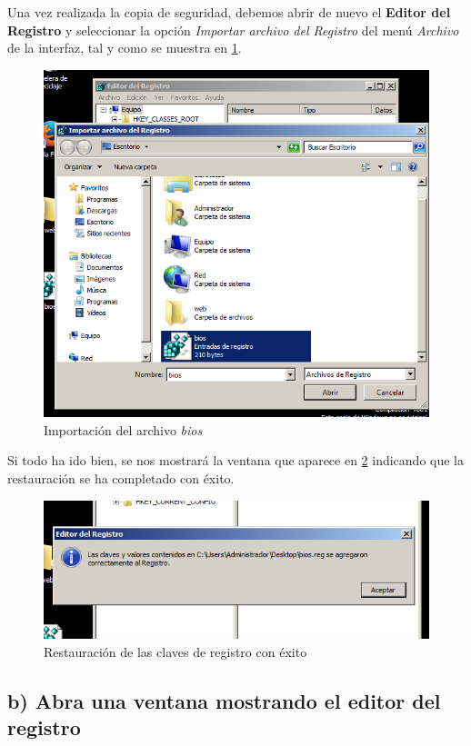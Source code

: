 Una vez realizada la copia de seguridad, debemos abrir de nuevo el \textbf{Editor del Registro} y seleccionar la opción \textit{Importar archivo del Registro} del menú \textit{Archivo} de la interfaz, tal y como se muestra en \ref{07}.

\begin{figure}[H]
	\centering
	\includegraphics[scale=0.6]{07.png}
	\caption{Importación del archivo \textit{bios}} \label{07}
\end{figure}

Si todo ha ido bien, se nos mostrará la ventana que aparece en \ref{08} indicando que la restauración se ha completado con éxito.

\begin{figure}[H]
	\centering
	\includegraphics[scale=0.6]{08.png}
	\caption{Restauración de las claves de registro con éxito} \label{08}
\end{figure}

\subsection{b) Abra una ventana mostrando el editor del registro}

